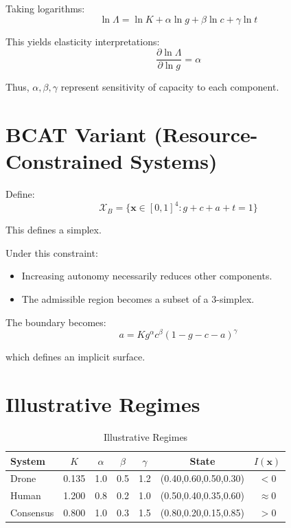\documentclass[letterpaper, 10 pt, conference]{ieeeconf}
\begin{document}
Taking logarithms:
\begin{equation}
\ln \Lambda = \ln K + \alpha \ln g + \beta \ln c + \gamma \ln t
\end{equation}

This yields elasticity interpretations:
\begin{equation}
\frac{\partial \ln \Lambda}{\partial \ln g} = \alpha
\end{equation}

Thus, $\alpha,\beta,\gamma$ represent sensitivity of capacity to each component.

\section{BCAT Variant (Resource-Constrained Systems)}

Define:
\begin{equation}
\mathcal{X}_B = \{ \mathbf{x} \in [0,1]^4 : g+c+a+t = 1 \}
\end{equation}

This defines a simplex.

Under this constraint:
\begin{itemize}
\item Increasing autonomy necessarily reduces other components.
\item The admissible region becomes a subset of a 3-simplex.
\end{itemize}

The boundary becomes:
\begin{equation}
a = K g^\alpha c^\beta (1 - g - c - a)^\gamma
\end{equation}

which defines an implicit surface.

\section{Illustrative Regimes}

\begin{table}[h]
\centering
\caption{Illustrative Regimes}
\begin{tabular}{lcccccc}
System & $K$ & $\alpha$ & $\beta$ & $\gamma$ & State & $I(\mathbf{x})$ \\
\hline
Drone & 0.135 & 1.0 & 0.5 & 1.2 & (0.40,0.60,0.50,0.30) & $<0$ \\
Human & 1.200 & 0.8 & 0.2 & 1.0 & (0.50,0.40,0.35,0.60) & $\approx 0$ \\
Consensus & 0.800 & 1.0 & 0.3 & 1.5 & (0.80,0.20,0.15,0.85) & $>0$ \\
\end{tabular}
\end{table}
\end{document}
